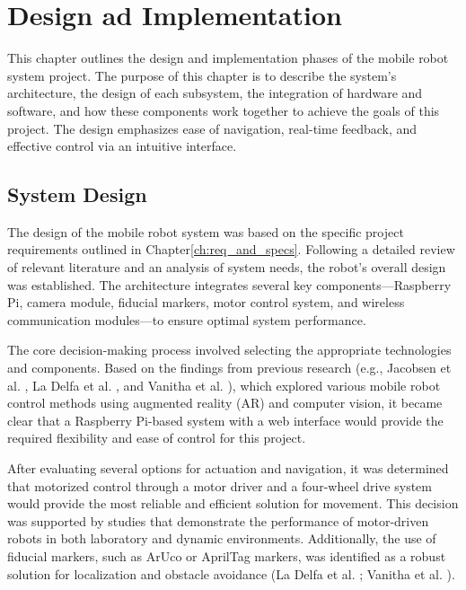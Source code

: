 \chapter{\label{ch:ch4} Design ad Implementation}

This chapter outlines the design and implementation phases of the mobile robot system project. The purpose of this chapter is to describe the system’s architecture, the design of each subsystem, the integration of hardware and software, and how these components work together to achieve the goals of this project. The design emphasizes ease of navigation, real-time feedback, and effective control via an intuitive interface.

\section{\label{sec:ch4_firstsec}System Design}

The design of the mobile robot system was based on the specific project requirements outlined in Chapter\ref{ch:req_and_specs}. Following a detailed review of relevant literature and an analysis of system needs, the robot’s overall design was established. The architecture integrates several key components—Raspberry Pi, camera module, fiducial markers, motor control system, and wireless communication modules—to ensure optimal system performance.

The core decision-making process involved selecting the appropriate technologies and components. Based on the findings from previous research (e.g., Jacobsen et al. \cite{jacobsen2018}, La Delfa et al. \cite{delfa2015}, and Vanitha et al. \cite{vanitha2016}), which explored various mobile robot control methods using augmented reality (AR) and computer vision, it became clear that a Raspberry Pi-based system with a web interface would provide the required flexibility and ease of control for this project.

After evaluating several options for actuation and navigation, it was determined that motorized control through a motor driver and a four-wheel drive system would provide the most reliable and efficient solution for movement. This decision was supported by studies that demonstrate the performance of motor-driven robots in both laboratory and dynamic environments. Additionally, the use of fiducial markers, such as ArUco or AprilTag markers, was identified as a robust solution for localization and obstacle avoidance (La Delfa et al. \cite{delfa2015}; Vanitha et al. \cite{vanitha2016}).

